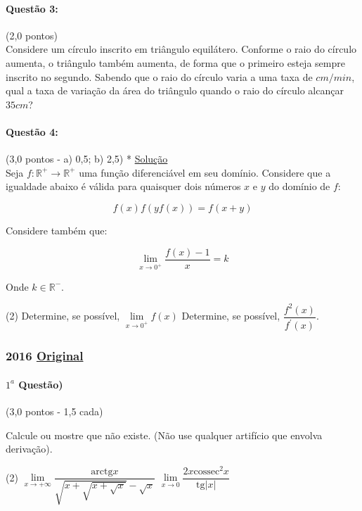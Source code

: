 \documentclass[12pt,a4paper]{article}
\newcommand{\R}{\mathbb{R}}
\newcommand{\original}[1]{\tiny \href{#1}{Original} \normalsize}
\begin{document}
\paragraph{Questão 3: }(2,0 pontos) \\
Considere um círculo inscrito em triângulo equilátero. Conforme o raio do círculo aumenta, o triângulo também aumenta, de forma que o primeiro esteja sempre inscrito no segundo. Sabendo que o raio do círculo varia a uma taxa de $\mathit{ cm/min}$, qual a taxa de variação da área do triângulo quando o raio do círculo alcançar $35 \mathit{  cm}$?

\paragraph{Questão 4: }(3,0 pontos - a) 0,5; b) 2,5) \hfill \scriptsize \hypertarget{calculove12017q4volta}{* }\hyperlink{calculove12017q4ida}{Solução}\normalsize\\
Seja $f: \R^+ \rightarrow \R^+$ uma função diferenciável em seu domínio. Considere que a igualdade abaixo é válida para quaisquer dois números $x$ e $y$ do domínio de $f$:

$$f(x)f\left(yf(x)\right) = f(x+y)$$

Considere também que:

$$\lim\limits_{x\to 0^+} \dfrac{f(x)-1}{x} = k$$

Onde $k\in \R^-$.

\begin{tasks}(2)
\task Determine, se possível, $\lim\limits_{x\to 0^+} f(x)$
\task Determine, se possível, $\dfrac{f^2(x)}{f^{\prime}(x)}$.
\end{tasks}


\newpage

\subsubsection{2016 \original{https://drive.google.com/file/d/11dNK93dA3wdr6dby8Vvfe-wC1w1neVfH/view?usp=sharing}}


\paragraph{$1^a$ Questão)} (3,0 pontos - 1,5 cada)

Calcule ou mostre que não existe. (Não use qualquer artifício que envolva derivação).

\begin{tasks}(2)
\task $\lim\limits_{x \rightarrow +\infty} \dfrac{\textrm{arctg}x}{\sqrt{x+\sqrt{x+\sqrt{x}}}-\sqrt{x}}$
\task $\lim\limits_{x\rightarrow 0}\dfrac{2x\textrm{cossec}^2x}{\textrm{tg}{\vert x \vert}}  $
\end{tasks}
\end{document}
